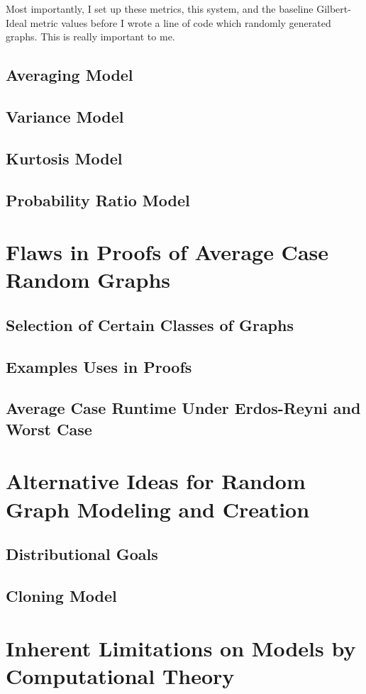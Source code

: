\documentclass[11pt,a4paper]{report}
\begin{document}
Most importantly, I set up these metrics, this system, and the baseline Gilbert-Ideal metric values before I wrote a line of code which randomly generated graphs.
This is really important to me.


\subsection{Averaging Model}
\subsection{Variance Model}
\subsection{Kurtosis Model}
\subsection{Probability Ratio Model}

\section{Flaws in Proofs of Average Case Random Graphs}
\subsection{Selection of Certain Classes of Graphs}
\subsection{Examples Uses in Proofs}
\subsection{Average Case Runtime Under Erdos-Reyni and Worst Case}

\section{Alternative Ideas for Random Graph Modeling and Creation}
\subsection{Distributional Goals}
\subsection{Cloning Model}

\section{Inherent Limitations on Models by Computational Theory}
\end{document}
